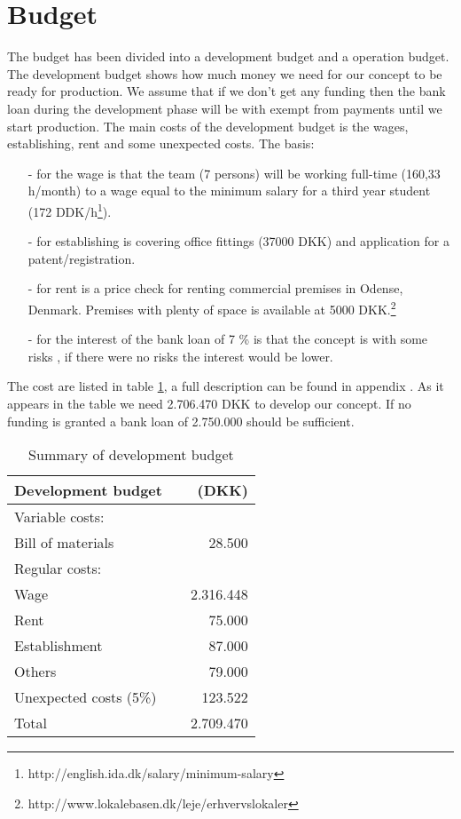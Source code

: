 \section{Budget}
\label{budget_label}
The budget has been divided into a development budget and a operation budget. The development budget  shows how much money we need for our concept to be ready for production. We assume that if we don't get any funding then the bank loan during the development phase will be with exempt from payments until we start production. The main costs of the development budget is the wages, establishing, rent and some unexpected costs. 
The basis: \begin{itemize}
\item[-] for the wage is that the team (7 persons) will be working full-time (160,33 h/month) to a wage equal to the minimum salary for a third year student (172 DDK/h\footnote{http://english.ida.dk/salary/minimum-salary}).
\item[-] for establishing is covering office fittings (37000 DKK) and application for a patent/registration.
\item[-] for rent is a price check for renting commercial premises in Odense, Denmark. Premises with plenty of space is available at 5000 DKK.\footnote{http://www.lokalebasen.dk/leje/erhvervslokaler}
\item[-] for the interest of the bank loan of 7 \% is that the concept is with some risks , if there were no risks the interest would be lower. 
\end{itemize} 
The cost are listed in table \ref{devbud}, a full description can be found in appendix . As it appears in the table we need 2.706.470 DKK to develop our concept. If no funding is granted a bank loan of 2.750.000 should be sufficient.

\begin{table}[h!]
\label{devbud}
\centering
\begin{tabular}{l c r}
Development budget &&(DKK)\\
\hline
Variable costs: 					  	&	& \\
Bill of materials	  					&	& 28.500  \\
Regular costs: 						  	&  	& 		\\
Wage    								&	& 2.316.448\\
Rent 									&   & 75.000\\
Establishment							&   & 87.000\\
Others				 					&   & 79.000\\
Unexpected costs (5\%) 					&   & 123.522\\
\hline
Total         							&   & 2.709.470\\
\end{tabular}
\caption{Summary of development budget}
\end{table}

